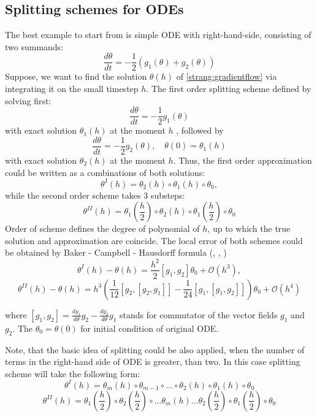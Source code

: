 \documentclass{article}
\begin{document}
\subsection{Splitting schemes for ODEs}
The best example to start from is simple ODE with right-hand-side, consisting of two summands:
\begin{equation}
    \frac{d \theta}{d t} = - \frac{1}{2} \left( g_1(\theta) + g_2(\theta)\right)
    \label{strang:gradientflow}
\end{equation}
Suppose, we want to find the solution $\theta(h)$ of \eqref{strang:gradientflow} via integrating it on the small timestep $h$. The first order splitting scheme defined by solving first:
$$
\frac{d \theta}{d t} = - \frac{1}{2} g_1(\theta)
$$
with exact solution $\theta_1(h)$ at the moment $h$ , followed by
$$
\frac{d \theta}{d t} = - \frac{1}{2} g_2(\theta), \quad \theta(0) = \theta_1(h)
$$
with exact solution $\theta_2(h)$ at the moment $h$. Thus, the first order approximation could be written as a combinations of both solutions:
$$
\theta^I(h) = \theta_2(h) \circ \theta_1(h) \circ \theta_0,
$$
while the second order scheme takes 3 substeps:
$$
\theta^{II}(h) = \theta_1\left(\frac{h}{2}\right) \circ \theta_2(h) \circ \theta_1\left(\frac{h}{2}\right) \circ \theta_0
$$
Order of scheme defines the degree of polynomial of $h$, up to which the true solution and approximation are coincide. The local error of both schemes could be obtained by Baker - Campbell - Hausdorff formula (\cite{baker1901further}, \cite{campbell1896law}, \cite{hausdorff1906symbolische})
\begin{equation}
    \label{strang:lie_error}
    \theta^I(h) - \theta(h) = \frac{h^2}{2} \left[g_{1}, g_{2}\right] \theta_0 + \mathcal{O}(h^3),
\end{equation}
\begin{equation}
    \label{strang:marchuk_error}
    \theta^{II}(h) - \theta(h) = h^{3} \left(\frac{1}{12}[g_2,[g_2, g_1]]-\frac{1}{24}[g_1,[g_1, g_2]]\right)\theta_0+\mathcal{O}\left(h^{4}\right)
\end{equation}

where $\left[ g_1, g_2\right] = \frac{d g_1}{d \theta} g_2 - \frac{d g_2}{d \theta} g_1 $ stands for commutator of the vector fields $g_1$ and $g_2$. The $\theta_0 = \theta(0)$ for initial condition of original ODE.

Note, that the basic idea of splitting could be also applied, when the number of terms in the right-hand side of ODE is greater, than two. In this case splitting scheme will take the following form:
\begin{equation}\label{strang:marchuk}
	\theta^I(h) = \theta_m(h) \circ \theta_{m-1} \circ \ldots \circ \theta_2(h) \circ \theta_1(h) \circ \theta_0
\end{equation}
\begin{equation}\label{strang:strang}
	\theta^{II}(h) = \theta_1\left(\frac{h}{2}\right) \circ \theta_2\left(\frac{h}{2}\right) \circ\ldots \theta_m(h) \ldots \theta_2\left(\frac{h}{2}\right) \circ \theta_1\left(\frac{h}{2}\right) \circ \theta_0
\end{equation}
\end{document}
